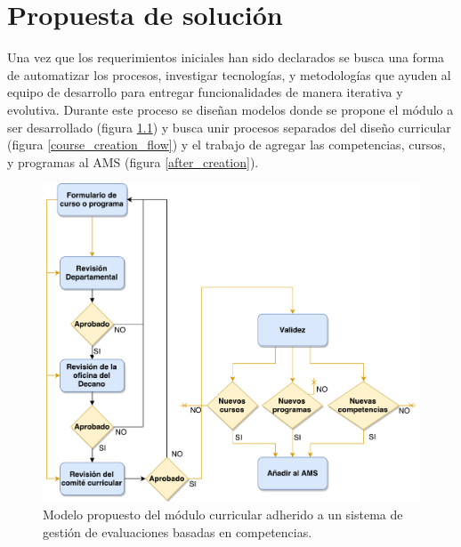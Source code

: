\chapter{Propuesta de solución} %
\label{capitulo5} %
Una vez que los requerimientos iniciales han sido declarados se busca una forma de automatizar los procesos, investigar tecnologías, y metodologías que ayuden al equipo de desarrollo para entregar funcionalidades de manera iterativa y evolutiva. Durante este proceso se diseñan modelos donde se propone el módulo a ser desarrollado (figura \ref{curriculum_model}) y busca unir procesos separados del diseño curricular (figura \ref{course_creation_flow}) y el trabajo de agregar las competencias, cursos, y programas al AMS (figura \ref{after_creation}).

\begin{figure}
\centering
\includegraphics[scale=0.5]{Capitulos/PropuestadeSolucion/Imagenes/curriculum_model}
\caption{Modelo propuesto del módulo curricular adherido a un sistema de gestión de evaluaciones basadas en competencias.}
  \label{curriculum_model}
\end{figure}



